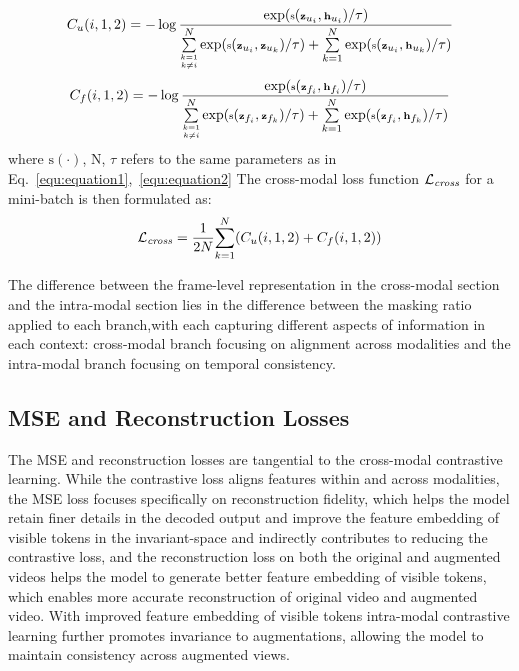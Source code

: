 \begin{equation}
\scriptsize
C_u(i, 1, 2) = -\log \frac{\exp(\text{s}(\textbf{z}_{u_i}, \textbf{h}_{u_i})/\tau)}{\sum\limits_{\substack{k=1 \\ k \neq i}}^{N} \exp(\text{s}(\textbf{z}_{u_i}, \textbf{z}_{u_k})/\tau) + \sum\limits_{k=1}^{N}\exp(\text{s}(\textbf{z}_{u_i}, \textbf{h}_{u_k})/\tau)}
\end{equation}
\begin{equation}
\scriptsize
C_f(i, 1, 2) = -\log \frac{\exp(\text{s}(\textbf{z}_{f_i}, \textbf{h}_{f_i})/\tau)}{\sum\limits_{\substack{k=1 \\ k \neq i}}^{N} \exp(\text{s}(\textbf{z}_{f_i}, \textbf{z}_{f_k})/\tau) + \sum\limits_{k=1}^{N}\exp(\text{s}(\textbf{z}_{f_i}, \textbf{h}_{f_k})/\tau)}
\end{equation}
\noindent where \(\text{s}(\cdot)\), N, $\tau$ refers to the same parameters as in Eq.~\ref{equ:equation1},~\ref{equ:equation2} The cross-modal loss function $\mathcal{L}_{\text{\textit{cross}}}$ for a mini-batch is then formulated as:
\vspace{-5pt}
\begin{equation}
\mathcal{L}_{\text{\textit{cross}}} = \frac{1}{2N}{\sum_{k=1}^{N} (C_u(i, 1, 2) + C_f(i, 1, 2)})
\end{equation}

The difference between the frame-level representation in the cross-modal section and the intra-modal section lies in the difference between the masking ratio applied to each branch,with each capturing different aspects of information in each context: cross-modal branch focusing on alignment across modalities and the intra-modal branch focusing on temporal consistency.

\subsection{MSE and Reconstruction Losses}

The MSE and reconstruction losses are tangential to the cross-modal contrastive learning. While the contrastive loss aligns features within and across modalities, the MSE loss focuses specifically on reconstruction fidelity, which helps the model retain finer details in the decoded output and improve the feature embedding of visible tokens in the invariant-space and indirectly contributes to reducing the contrastive loss, and the reconstruction loss on both the original and augmented videos helps the model to generate better feature embedding of visible tokens, which enables more accurate reconstruction of original video and augmented video. With improved feature embedding of visible tokens intra-modal contrastive learning further promotes invariance to augmentations, allowing the model to maintain consistency across augmented views. 

